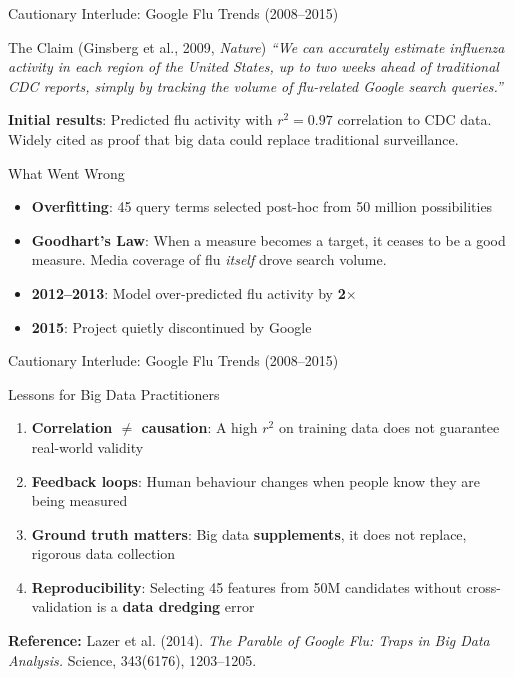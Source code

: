 \documentclass[aspectratio=169,10pt]{beamer}
\begin{document}
\begin{frame}{Cautionary Interlude: Google Flu Trends (2008--2015)}
  
      \begin{block}{The Claim (Ginsberg et al., 2009, \textit{Nature})}
        \textit{``We can accurately estimate influenza activity in each region of the United States, up to two weeks ahead of traditional CDC reports, simply by tracking the volume of flu-related Google search queries.''}
      \end{block}
      \vspace{6pt}
      \textbf{Initial results}: Predicted flu activity with $r^2 = 0.97$ correlation to CDC data.  Widely cited as proof that big data could replace traditional surveillance.
      \vspace{6pt}
      \begin{alertblock}{What Went Wrong}
        \begin{itemize}
          \item \textbf{Overfitting}: 45 query terms selected post-hoc from 50 million possibilities
          \item \textbf{Goodhart's Law}: When a measure becomes a target, it ceases to be a good measure.  Media coverage of flu \emph{itself} drove search volume.
          \item \textbf{2012--2013}: Model over-predicted flu activity by \textbf{2$\times$}
          \item \textbf{2015}: Project quietly discontinued by Google
        \end{itemize}
      \end{alertblock}

    
\end{frame}
\begin{frame}{Cautionary Interlude: Google Flu Trends (2008--2015)}
      \begin{exampleblock}{Lessons for Big Data Practitioners}
        \begin{enumerate}
          \item \textbf{Correlation $\neq$ causation}: A high $r^2$ on training data does not guarantee real-world validity
          \item \textbf{Feedback loops}: Human behaviour changes when people know they are being measured
          \item \textbf{Ground truth matters}: Big data \textbf{supplements}, it does not replace, rigorous data collection
          \item \textbf{Reproducibility}: Selecting 45 features from 50M candidates without cross-validation is a \textbf{data dredging} error
        \end{enumerate}
        \vspace{4pt}
        \textbf{Reference:} Lazer et al. (2014). \textit{The Parable of Google Flu: Traps in Big Data Analysis.} Science, 343(6176), 1203--1205.
      \end{exampleblock}
 
\end{frame}
\end{document}
